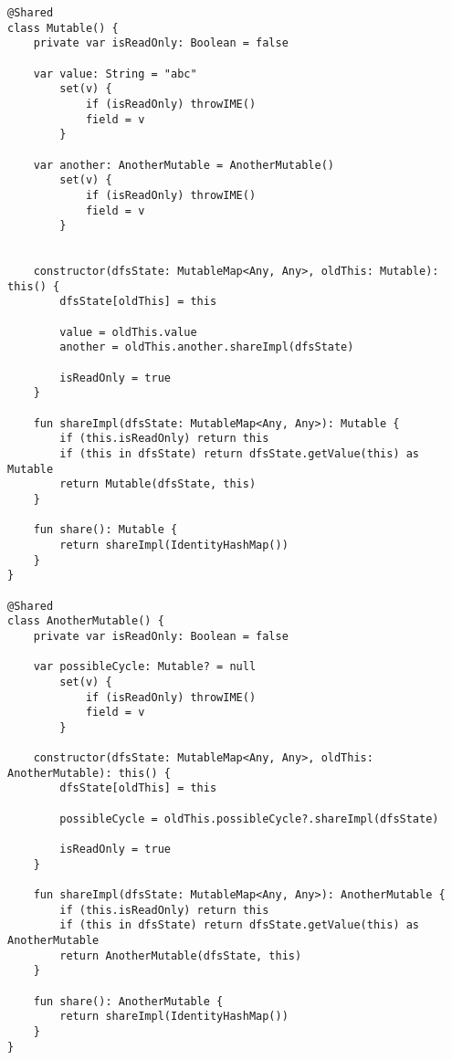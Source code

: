 \documentclass[specification,annotation,times]{itmo-student-thesis}
\begin{document}
\begin{lstlisting}[caption={Код, аналогичный трансформированному}]
@Shared
class Mutable() {
    private var isReadOnly: Boolean = false

    var value: String = "abc"
        set(v) {
            if (isReadOnly) throwIME()
            field = v
        }

    var another: AnotherMutable = AnotherMutable()
        set(v) {
            if (isReadOnly) throwIME()
            field = v
        }


    constructor(dfsState: MutableMap<Any, Any>, oldThis: Mutable): this() {
        dfsState[oldThis] = this

        value = oldThis.value
        another = oldThis.another.shareImpl(dfsState)

        isReadOnly = true
    }

    fun shareImpl(dfsState: MutableMap<Any, Any>): Mutable {
        if (this.isReadOnly) return this
        if (this in dfsState) return dfsState.getValue(this) as Mutable
        return Mutable(dfsState, this)
    }

    fun share(): Mutable {
        return shareImpl(IdentityHashMap())
    }
}

@Shared
class AnotherMutable() {
    private var isReadOnly: Boolean = false

    var possibleCycle: Mutable? = null
        set(v) {
            if (isReadOnly) throwIME()
            field = v
        }

    constructor(dfsState: MutableMap<Any, Any>, oldThis: AnotherMutable): this() {
        dfsState[oldThis] = this

        possibleCycle = oldThis.possibleCycle?.shareImpl(dfsState)

        isReadOnly = true
    }

    fun shareImpl(dfsState: MutableMap<Any, Any>): AnotherMutable {
        if (this.isReadOnly) return this
        if (this in dfsState) return dfsState.getValue(this) as AnotherMutable
        return AnotherMutable(dfsState, this)
    }

    fun share(): AnotherMutable {
        return shareImpl(IdentityHashMap())
    }
}
\end{lstlisting}
\end{document}
